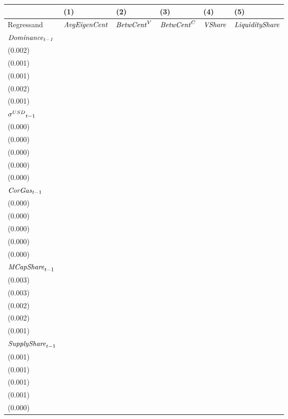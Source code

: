 \begin{tabular}{llllll}
\toprule
{} &                                   (1) &                                   (2) &                                   (3) &                                  (4) &                                   (5) \\
\midrule
Regressand                   &                  ${\it AvgEigenCent}$ &                    ${\it BetwCent}^V$ &                    ${\it BetwCent}^C$ &                       ${\it VShare}$ &                ${\it LiquidityShare}$ \\
$\it Dominance_{t-1}$        &   \makecell{$0.722^{***}$ \\ (0.002)} &   \makecell{$0.828^{***}$ \\ (0.001)} &   \makecell{$0.928^{***}$ \\ (0.001)} &  \makecell{$0.729^{***}$ \\ (0.002)} &   \makecell{$0.972^{***}$ \\ (0.001)} \\
${{\it \sigma}^{USD}}_{t-1}$ &      \makecell{$0.000^{}$ \\ (0.000)} &      \makecell{$0.000^{}$ \\ (0.000)} &      \makecell{$0.000^{}$ \\ (0.000)} &    \makecell{$-0.000^{}$ \\ (0.000)} &     \makecell{$-0.000^{}$ \\ (0.000)} \\
${{\it CorGas}}_{t-1}$       &      \makecell{$0.000^{}$ \\ (0.000)} &     \makecell{$-0.000^{}$ \\ (0.000)} &      \makecell{$0.000^{}$ \\ (0.000)} &    \makecell{$0.000^{*}$ \\ (0.000)} &     \makecell{$-0.000^{}$ \\ (0.000)} \\
${{\it MCapShare}}_{t-1}$    &  \makecell{$-0.029^{***}$ \\ (0.003)} &   \makecell{$0.159^{***}$ \\ (0.003)} &   \makecell{$0.079^{***}$ \\ (0.002)} &  \makecell{$0.049^{***}$ \\ (0.002)} &   \makecell{$0.020^{***}$ \\ (0.001)} \\
${{\it SupplyShare}}_{t-1}$  &   \makecell{$0.030^{***}$ \\ (0.001)} &  \makecell{$-0.010^{***}$ \\ (0.001)} &  \makecell{$-0.003^{***}$ \\ (0.001)} &  \makecell{$0.015^{***}$ \\ (0.001)} &  \makecell{$-0.004^{***}$ \\ (0.000)} \\

\end{tabular}
